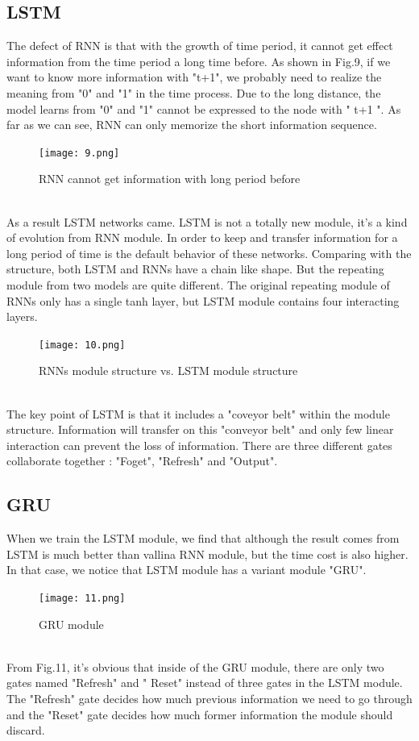 \documentclass{article}
\begin{document}
\subsection{LSTM}
\noindent The defect of RNN is that with the growth of time period, it cannot get effect information from the time period a long time before. As shown in Fig.9, if we want to know more information with "t+1", we probably need to realize the meaning from "0" and "1" in the time process. Due to the long distance, the model learns from "0" and "1" cannot be expressed to the node with " t+1 ". As far as we can see, RNN can only memorize the short information sequence.
\begin{figure}[h]
	\centering
	\texttt{[image: 9.png]}
	\caption{RNN cannot get information with long period before}
\end{figure}\\
\noindent As a result LSTM networks came. LSTM is not a totally new module, it's a kind of evolution from RNN module. In order to keep and transfer information for a long period of time is the default behavior of these networks. Comparing with the structure, both LSTM and RNNs have a chain like shape. But the repeating module from two models are quite different. The original repeating module of RNNs only has a single tanh layer, but LSTM module contains four interacting layers.
\begin{figure}[h]
	\centering
	\texttt{[image: 10.png]}
	\caption{RNNs module structure vs. LSTM module structure}
\end{figure}\\

\noindent The key point of LSTM is that it includes a "coveyor belt" within the module structure. Information will transfer on this "conveyor belt" and only few linear interaction can prevent the loss of information. There are three different gates collaborate together : "Foget", "Refresh" and "Output". \\
\subsection{GRU}
\noindent When we train the LSTM module, we find that although the result comes from LSTM is much better than vallina RNN module, but the time cost is also higher. In that case, we notice that LSTM module has a variant module "GRU".
\begin{figure}[h]
	\centering
	\texttt{[image: 11.png]}
	\caption{GRU module}
\end{figure}\\
\noindent From Fig.11, it's obvious that inside of the GRU module, there are only two gates named "Refresh" and " Reset" instead of three gates in the LSTM module. The "Refresh" gate decides how much previous information we need to go through and the "Reset" gate decides how much former information the module should discard.\\
\end{document}
